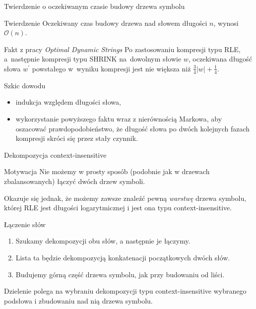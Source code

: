 \documentclass[polish]{beamer}
\begin{document}
\begin{frame}{Twierdzenie o oczekiwanym czasie budowy drzewa symbolu}
    \begin{alertblock}{Twierdzenie}
        Oczekiwany czas budowy drzewa nad słowem długości $n$, wynosi $\mathcal{O}(n)$.
    \end{alertblock}
    \pause
    \begin{block}{Fakt z pracy \textit{Optimal Dynamic Strings}}
        Po zastosowaniu kompresji typu RLE, a~następnie kompresji typu SHRINK na~dowolnym słowie $w$, oczekiwana długość słowa $w^\prime$ powstałego w~wyniku kompresji jest nie większa niż $\frac{3}{4}|w| + \frac{1}{4}$.
    \end{block}
    \pause
    \begin{block}{Szkic dowodu} \pause
        \begin{itemize}
            \item indukcja względem długości słowa, \pause
            \item wykorzystanie powyższego faktu wraz z nierównością Markowa, aby oszacować prawdopodobieństwo, że długość słowa po dwóch kolejnych fazach kompresji skróci się przez stały czynnik.
        \end{itemize}
    \end{block}
\end{frame}

\begin{frame}{Dekompozycja context-insensitive}
    \begin{alertblock}{Motywacja}
        Nie możemy w prosty sposób (podobnie jak w drzewach zbalansowanych) łączyć dwóch drzew symboli. 
    \end{alertblock}
    \pause
    Okazuje się jednak, że możemy zawsze znaleźć pewną \textit{warstwę} drzewa symbolu, której RLE jest długości logarytmicznej i jest ona typu context-insensitive.
    \pause
    \begin{block}{Łączenie słów} \pause
        \begin{enumerate}
            \item Szukamy dekompozycji obu słów, a następnie je łączymy. \pause
            \item Lista ta będzie dekompozycją konkatenacji początkowych dwóch słów. \pause
            \item Budujemy górną część drzewa symbolu, jak przy budowaniu od liści.
        \end{enumerate}
    \end{block}
    \pause
    \begin{block}{}
        Dzielenie polega na wybraniu dekompozycji typu context-insensitive wybranego podsłowa i zbudowaniu nad nią drzewa symbolu.
    \end{block}
\end{frame}
\end{document}
